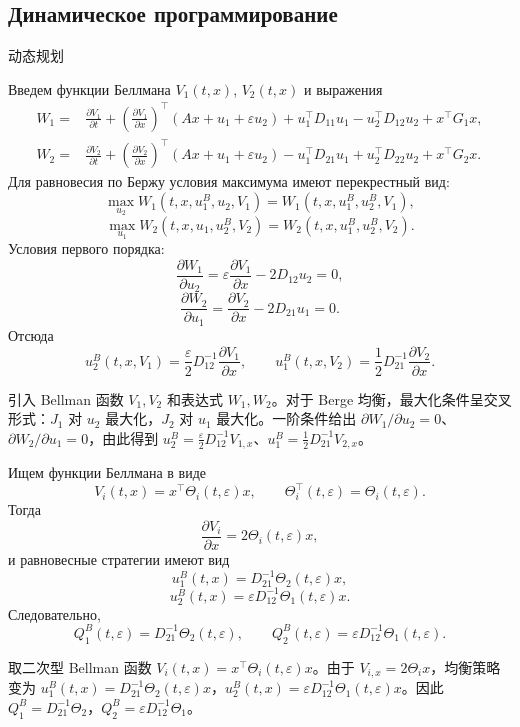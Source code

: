 \documentclass[12pt,a4paper]{article}
\newcommand{\zh}[1]{\par\noindent #1\par}
\begin{document}
\subsection*{Динамическое программирование}
\zh{动态规划}
Введем функции Беллмана \(V_1(t,x)\), \(V_2(t,x)\) и выражения
\[
\begin{aligned}
W_1={}&\frac{\partial V_1}{\partial t}+\left(\frac{\partial V_1}{\partial x}\right)^{\top}(Ax+u_1+\varepsilon u_2)
+u_1^{\top}D_{11}u_1-u_2^{\top}D_{12}u_2+x^{\top}G_1x,\\
W_2={}&\frac{\partial V_2}{\partial t}+\left(\frac{\partial V_2}{\partial x}\right)^{\top}(Ax+u_1+\varepsilon u_2)
-u_1^{\top}D_{21}u_1+u_2^{\top}D_{22}u_2+x^{\top}G_2x.
\end{aligned}
\]
Для равновесия по Бержу условия максимума имеют перекрестный вид:
\[
\max_{u_2}W_1(t,x,u_1^B,u_2,V_1)=W_1(t,x,u_1^B,u_2^B,V_1),
\]
\[
\max_{u_1}W_2(t,x,u_1,u_2^B,V_2)=W_2(t,x,u_1^B,u_2^B,V_2).
\]
Условия первого порядка:
\[
\frac{\partial W_1}{\partial u_2}=\varepsilon\frac{\partial V_1}{\partial x}-2D_{12}u_2=0,
\]
\[
\frac{\partial W_2}{\partial u_1}=\frac{\partial V_2}{\partial x}-2D_{21}u_1=0.
\]
Отсюда
\[
u_2^B(t,x,V_1)=\frac{\varepsilon}{2}D_{12}^{-1}\frac{\partial V_1}{\partial x},
\qquad
u_1^B(t,x,V_2)=\frac12D_{21}^{-1}\frac{\partial V_2}{\partial x}.
\]
\zh{引入 Bellman 函数 \(V_1,V_2\) 和表达式 \(W_1,W_2\)。对于 Berge 均衡，最大化条件呈交叉形式：\(J_1\) 对 \(u_2\) 最大化，\(J_2\) 对 \(u_1\) 最大化。一阶条件给出 \(\partial W_1/\partial u_2=0\)、\(\partial W_2/\partial u_1=0\)，由此得到 \(u_2^B=\frac{\varepsilon}{2}D_{12}^{-1}V_{1,x}\)、\(u_1^B=\frac12D_{21}^{-1}V_{2,x}\)。}

Ищем функции Беллмана в виде
\[
V_i(t,x)=x^{\top}\Theta_i(t,\varepsilon)x,
\qquad \Theta_i^{\top}(t,\varepsilon)=\Theta_i(t,\varepsilon).
\]
Тогда
\[
\frac{\partial V_i}{\partial x}=2\Theta_i(t,\varepsilon)x,
\]
и равновесные стратегии имеют вид
\[
u_1^B(t,x)=D_{21}^{-1}\Theta_2(t,\varepsilon)x,
\]
\[
u_2^B(t,x)=\varepsilon D_{12}^{-1}\Theta_1(t,\varepsilon)x.
\]
Следовательно,
\[
Q_1^B(t,\varepsilon)=D_{21}^{-1}\Theta_2(t,\varepsilon),
\qquad
Q_2^B(t,\varepsilon)=\varepsilon D_{12}^{-1}\Theta_1(t,\varepsilon).
\]
\zh{取二次型 Bellman 函数 \(V_i(t,x)=x^\top\Theta_i(t,\varepsilon)x\)。由于 \(V_{i,x}=2\Theta_i x\)，均衡策略变为 \(u_1^B(t,x)=D_{21}^{-1}\Theta_2(t,\varepsilon)x\)，\(u_2^B(t,x)=\varepsilon D_{12}^{-1}\Theta_1(t,\varepsilon)x\)。因此 \(Q_1^B=D_{21}^{-1}\Theta_2\)，\(Q_2^B=\varepsilon D_{12}^{-1}\Theta_1\)。}

\end{document}
